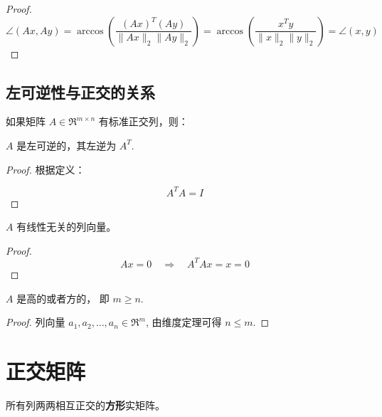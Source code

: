 \begin{proof}
    \begin{equation} \angle(A x, A y)=\arccos \left(\frac{(A x)^{T}(A y)}{\|A x\|_{2}\|A y\|_{2}}\right)=\arccos \left(\frac{x^{T} y}{\|x\|_{2}\|y\|_{2}}\right)=\angle(x, y) \end{equation}
\end{proof}

\subsection{左可逆性与正交的关系}


如果矩阵 $ A \in \mathfrak{R}^{m \times n} $ 有标准正交列，则：

\begin{theorem}
    $ A $ 是左可逆的，其左逆为 $ A^{T} $.
\end{theorem}

\begin{proof}
    根据定义：

\begin{equation}
A^{T} A=I
\end{equation}
\end{proof}

\begin{theorem}
    $ A $ 有线性无关的列向量。
\end{theorem}

\begin{proof}
    \begin{equation}
A x=0 \quad \Rightarrow \quad A^{T} A x=x=0
\end{equation}
\end{proof}

\begin{theorem}
    $A$ 是高的或者方的， 即 $m \geq n$.
\end{theorem}

\begin{proof}
    列向量 $ a_{1}, a_{2}, \ldots, a_{n} \in \mathfrak{R}^{m} $, 由维度定理可得 $ n \leq m $.
\end{proof}

\section{正交矩阵}

\begin{definition}[正交矩阵]
    所有列两两相互正交的\textbf{方形}实矩阵。
\end{definition}

